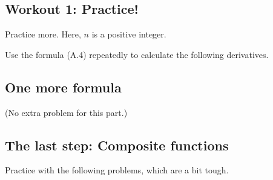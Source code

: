 \documentclass[11pt,pdfa,lastpage]{MishoNote}
\begin{document}
\subsection{Workout 1: Practice!}
\begin{enumerate}[resume]
\itemA Practice more. Here, $n$ is a positive integer.
\begin{menumerate}{3}
\end{menumerate}
\itemB Use the formula (A.4) repeatedly to calculate the following derivatives.
\begin{menumerate}{2}
\end{menumerate}
\end{enumerate}
\subsection{One more formula}
(No extra problem for this part.)

\subsection{The last step: Composite functions}

\begin{enumerate}[resume]
  \itemB Practice with the following problems, which are a bit tough.
  \begin{menumerate}{3}
  \end{menumerate}

\end{enumerate}
\end{document}
